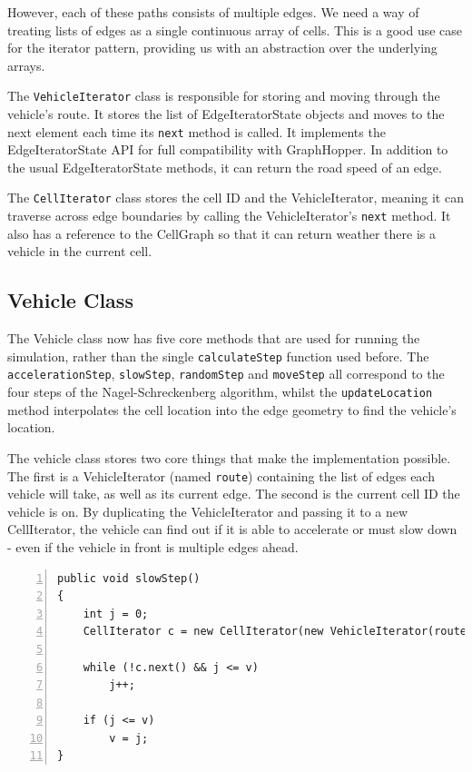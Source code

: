\documentclass[ %
                    author={Alexander Hill},
                supervisor={Dr. Benjamin Sach},
                    degree={MEng},
                     title={MARMOSET},
                  subtitle={Multi-Agent Route Management using Online Simulation for Efficient Transportation},
                      type={research},
                      year={2016} ]{dissertation}
\begin{document}
However, each of these paths consists of multiple edges. We need a way of treating
lists of edges as a single continuous array of cells. This is a good use case
for the iterator pattern, providing us with an abstraction over the underlying
arrays.

The \texttt{VehicleIterator} class is responsible for storing and moving through
the vehicle's route. It stores the list of EdgeIteratorState objects and moves
to the next element each time its \texttt{next} method is called. It implements
the EdgeIteratorState API for full compatibility with GraphHopper. In addition
to the usual EdgeIteratorState methods, it can return the road speed of an edge.

The \texttt{CellIterator} class stores the cell ID and the VehicleIterator,
meaning it can traverse across edge boundaries by calling the VehicleIterator's
\texttt{next} method. It also has a reference to the CellGraph so that it can
return weather there is a vehicle in the current cell.


\subsection{Vehicle Class}

The Vehicle class now has five core methods that are used for running the
simulation, rather than the single \texttt{calculateStep} function used before.
The \texttt{accelerationStep}, \texttt{slowStep}, \texttt{randomStep} and
\texttt{moveStep} all correspond to the four steps of the Nagel-Schreckenberg
algorithm, whilst the \texttt{updateLocation} method interpolates the cell
location into the edge geometry to find the vehicle's location.

The vehicle class stores two core things that make the implementation possible.
The first is a VehicleIterator (named \texttt{route}) containing the list of
edges each vehicle will take, as well as its current edge. The second is
the current cell ID the vehicle is on. By duplicating the VehicleIterator and
passing it to a new CellIterator, the vehicle can find out if it is able to
accelerate or must slow down - even if the vehicle in front is multiple edges ahead.

\begin{minipage}{\linewidth}
\begin{lstlisting}[caption={The \texttt{slowStep} implementation making use of the CellIterator},
                    label=lst:slowStep, numbers=left]
public void slowStep()
{
    int j = 0;
    CellIterator c = new CellIterator(new VehicleIterator(route), cg, cellId);

    while (!c.next() && j <= v)
        j++;

    if (j <= v)
        v = j;
}
\end{lstlisting}
\end{minipage}
\end{document}
